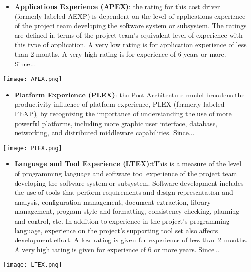 \begin{itemize}
	\item \textbf{Applications Experience (APEX)}: the rating for this cost driver (formerly labeled AEXP) is dependent on the level of applications experience of the project team developing the software system or subsystem. The ratings are defined in terms of the project team’s equivalent level of experience with this type of application. A very low rating is for application experience of less than 2 months. A very high rating is for experience of 6 years or more.  Since... \todo{}
\end{itemize}
\begin{center}
	\texttt{[image: APEX.png]}
\end{center}

\begin{itemize}
	\item \textbf{Platform Experience (PLEX)}: the Post-Architecture model broadens the productivity influence of platform experience, PLEX (formerly labeled PEXP), by recognizing the importance of understanding the use of more powerful platforms, including more graphic user interface, database, networking, and distributed	middleware capabilities.  Since... \todo{}
\end{itemize}
\begin{center}
	\texttt{[image: PLEX.png]}
\end{center}

\begin{itemize}
	\item \textbf{Language and Tool Experience (LTEX)}:tThis is a measure of the level of programming language and software tool experience of the project team developing the software system or subsystem. Software development includes the use of tools that perform requirements and design representation and analysis, configuration management, document extraction, library management, program style and formatting,
	consistency checking, planning and control, etc. In addition to experience in the project’s	programming language, experience on the project’s supporting tool set also affects development effort. A low rating is given for experience of less than 2 months. A very high rating is given for experience of 6 or more years.  Since... \todo{}
\end{itemize}
\begin{center}
	\texttt{[image: LTEX.png]}
\end{center}

